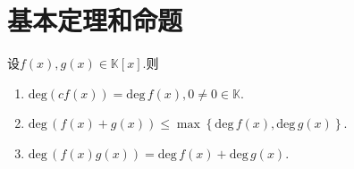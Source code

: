 \documentclass[../../main.tex]{subfiles}%
\begin{document}
\section{基本定理和命题}

\begin{proposition}[多项式次数的性质]\label{proposition:多项式次数的性质}
设$f(x),g(x)\in \mathbb{K}[x]$.则
\begin{enumerate}
\item $\mathrm{deg}\left( cf\left( x \right) \right) =\mathrm{deg}\,f\left( x \right) ,0\ne 0\in \mathbb{K} .$

\item $\mathrm{deg}\,\left( f\left( x \right) +g\left( x \right) \right) \leqslant\max \left\{ \mathrm{deg}\,f\left( x \right) ,\mathrm{deg}\,g\left( x \right) \right\} .$

\item $\mathrm{deg}\,\left( f\left( x \right) g\left( x \right) \right) =\mathrm{deg}\,f\left( x \right) +\mathrm{deg}\,g\left( x \right).$
\end{enumerate}
\end{proposition}
\end{document}
